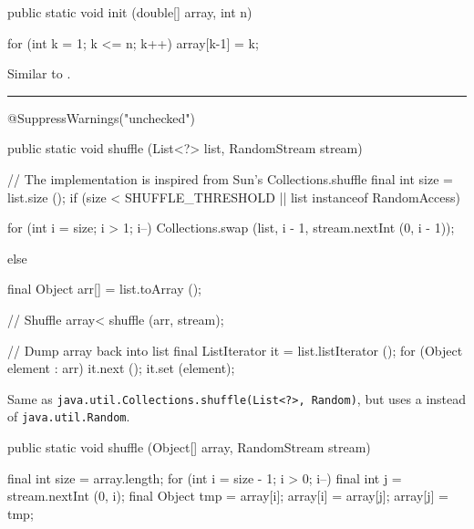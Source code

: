 \begin{htmlonly}
\end{htmlonly}
\begin{code}

   public static void init (double[] array, int n)\begin{hide} {
      for (int k = 1; k <= n; k++)
         array[k-1] = k;
   }\end{hide}
\end{code}
\begin{tabb} Similar to .
\bigskip\hrule
\end{tabb}
\begin{htmlonly}
\end{htmlonly}
\begin{code}
\begin{hide}@SuppressWarnings("unchecked")\end{hide}
   public static void shuffle (List<?> list, RandomStream stream)\begin{hide} {
      // The implementation is inspired from Sun's Collections.shuffle
      final int size = list.size ();
      if (size < SHUFFLE_THRESHOLD || list instanceof RandomAccess) {
         for (int i = size; i > 1; i--)
            Collections.swap (list, i - 1, stream.nextInt (0, i - 1));

      } else {
         final Object arr[] = list.toArray ();

         // Shuffle array<
         shuffle (arr, stream);

         // Dump array back into list
         final ListIterator it = list.listIterator ();
         for (Object element : arr) {
            it.next ();
            it.set (element);
         }
      }
   }\end{hide}
\end{code}
\begin{tabb} Same as \texttt{java.util.Collections.shuffle(List<?>, Random)},
 but uses a  instead of \texttt{java.util.Random}.
\end{tabb}
\begin{htmlonly}
\end{htmlonly}
\begin{code}

   public static void shuffle (Object[] array, RandomStream stream)\begin{hide} {
      final int size = array.length;
      for (int i = size - 1; i > 0; i--) {
         final int j = stream.nextInt (0, i);
         final Object tmp = array[i];
         array[i] = array[j];
         array[j] = tmp;
      }
   }\end{hide}
\end{code}

